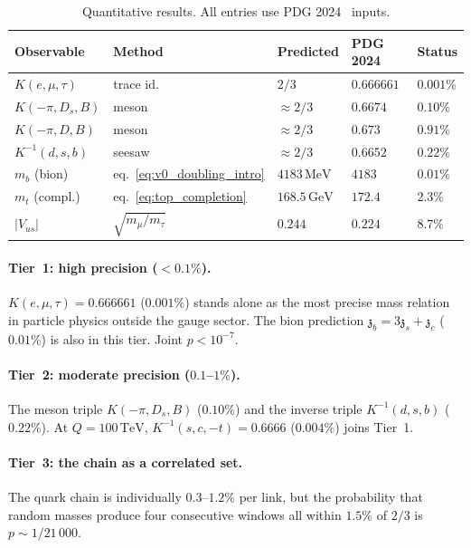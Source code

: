 \documentclass[12pt,a4paper]{article}
\newcommand{\MeV}{\,\mathrm{MeV}}
\newcommand{\GeV}{\,\mathrm{GeV}}
\newcommand{\TeV}{\,\mathrm{TeV}}
\newcommand{\zch}{\mathfrak{z}}
\begin{document}
\begin{table}[ht]
\centering\small
\begin{tabular}{lllll}
\hline
Observable & Method & Predicted & PDG 2024 & Status \\
\hline
$K(e,\mu,\tau)$ & trace id.\ & $2/3$ & $0.666661$ & $0.001\%$ \\
$K(-\pi,D_s,B)$ & meson & $\approx 2/3$ & $0.6674$ & $0.10\%$ \\
$K(-\pi,D,B)$ & meson & $\approx 2/3$ & $0.673$ & $0.91\%$ \\
$K^{-1}(d,s,b)$ & seesaw & $\approx 2/3$ & $0.6652$ & $0.22\%$ \\
$m_b$ (bion) & eq.~\eqref{eq:v0_doubling_intro} & $4183\MeV$ & $4183$ & $0.01\%$ \\
$m_t$ (compl.) & eq.~\eqref{eq:top_completion} & $168.5\GeV$ & $172.4$ & $2.3\%$ \\
$|V_{us}|$ & $\sqrt{m_\mu/m_\tau}$ & $0.244$ & $0.224$ & $8.7\%$ \\
\hline
\end{tabular}
\caption{Quantitative results.
  All entries use PDG 2024~\cite{PDG:2024} inputs.}
\label{tab:results}
\end{table}

\paragraph{Tier~1: high precision ($< 0.1\%$).}
$K(e,\mu,\tau) = 0.666661$ ($0.001\%$) stands alone as the
most precise mass relation in particle physics outside the
gauge sector.
The bion prediction $\zch_b = 3\zch_s + \zch_c$ ($0.01\%$) is
also in this tier.
Joint $p < 10^{-7}$.

\paragraph{Tier~2: moderate precision ($0.1$--$1\%$).}
The meson triple $K(-\pi, D_s, B)$ ($0.10\%$) and the
inverse triple $K^{-1}(d,s,b)$ ($0.22\%$).
At $Q = 100\TeV$, $K^{-1}(s,c,-t) = 0.6666$ ($0.004\%$) joins
Tier~1.

\paragraph{Tier~3: the chain as a correlated set.}
The quark chain is individually $0.3$--$1.2\%$ per link, but
the probability that random masses produce four consecutive
windows all within $1.5\%$ of $2/3$ is $p \sim 1/21\,000$.
\end{document}
